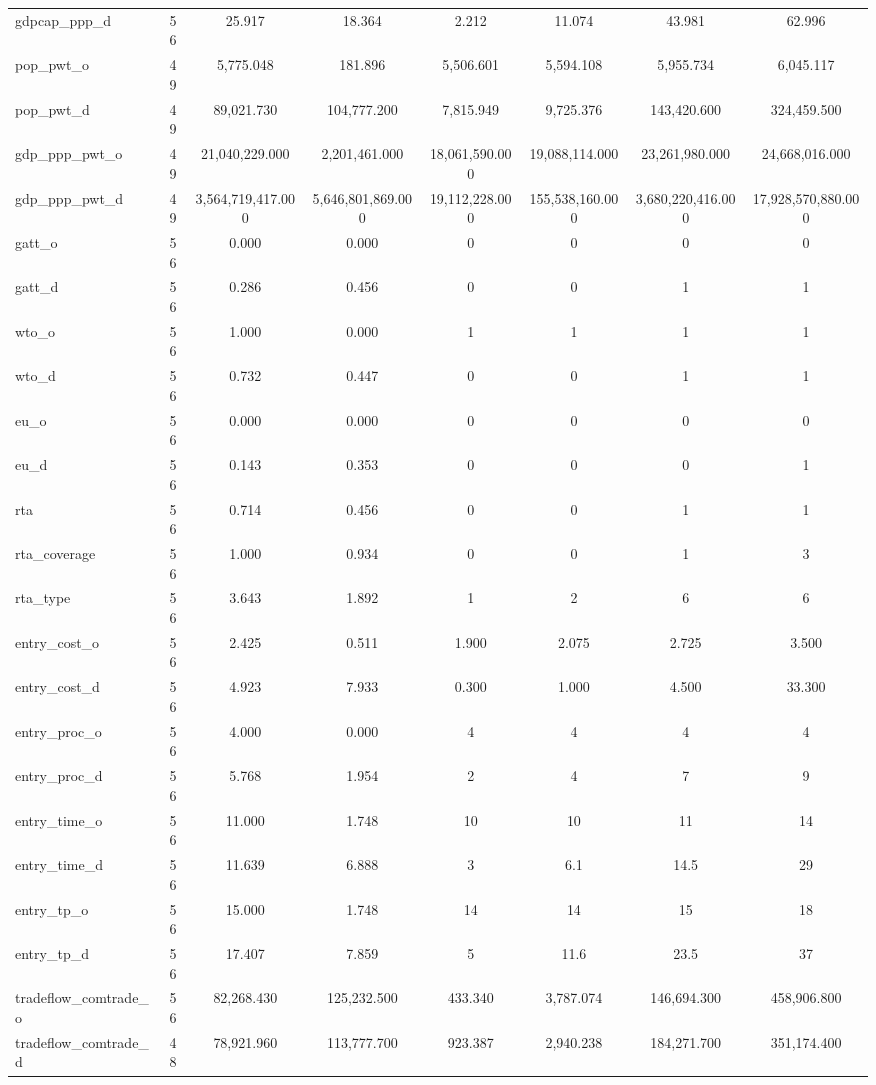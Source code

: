 \begin{table}[!htbp]
\begin{tabular}{@{\extracolsep{5pt}}lccccccc}
gdpcap\_ppp\_d & 56 & 25.917 & 18.364 & 2.212 & 11.074 & 43.981 & 62.996 \\ 
pop\_pwt\_o & 49 & 5,775.048 & 181.896 & 5,506.601 & 5,594.108 & 5,955.734 & 6,045.117 \\ 
pop\_pwt\_d & 49 & 89,021.730 & 104,777.200 & 7,815.949 & 9,725.376 & 143,420.600 & 324,459.500 \\ 
gdp\_ppp\_pwt\_o & 49 & 21,040,229.000 & 2,201,461.000 & 18,061,590.000 & 19,088,114.000 & 23,261,980.000 & 24,668,016.000 \\ 
gdp\_ppp\_pwt\_d & 49 & 3,564,719,417.000 & 5,646,801,869.000 & 19,112,228.000 & 155,538,160.000 & 3,680,220,416.000 & 17,928,570,880.000 \\ 
gatt\_o & 56 & 0.000 & 0.000 & 0 & 0 & 0 & 0 \\ 
gatt\_d & 56 & 0.286 & 0.456 & 0 & 0 & 1 & 1 \\ 
wto\_o & 56 & 1.000 & 0.000 & 1 & 1 & 1 & 1 \\ 
wto\_d & 56 & 0.732 & 0.447 & 0 & 0 & 1 & 1 \\ 
eu\_o & 56 & 0.000 & 0.000 & 0 & 0 & 0 & 0 \\ 
eu\_d & 56 & 0.143 & 0.353 & 0 & 0 & 0 & 1 \\ 
rta & 56 & 0.714 & 0.456 & 0 & 0 & 1 & 1 \\ 
rta\_coverage & 56 & 1.000 & 0.934 & 0 & 0 & 1 & 3 \\ 
rta\_type & 56 & 3.643 & 1.892 & 1 & 2 & 6 & 6 \\ 
entry\_cost\_o & 56 & 2.425 & 0.511 & 1.900 & 2.075 & 2.725 & 3.500 \\ 
entry\_cost\_d & 56 & 4.923 & 7.933 & 0.300 & 1.000 & 4.500 & 33.300 \\ 
entry\_proc\_o & 56 & 4.000 & 0.000 & 4 & 4 & 4 & 4 \\ 
entry\_proc\_d & 56 & 5.768 & 1.954 & 2 & 4 & 7 & 9 \\ 
entry\_time\_o & 56 & 11.000 & 1.748 & 10 & 10 & 11 & 14 \\ 
entry\_time\_d & 56 & 11.639 & 6.888 & 3 & 6.1 & 14.5 & 29 \\ 
entry\_tp\_o & 56 & 15.000 & 1.748 & 14 & 14 & 15 & 18 \\ 
entry\_tp\_d & 56 & 17.407 & 7.859 & 5 & 11.6 & 23.5 & 37 \\ 
tradeflow\_comtrade\_o & 56 & 82,268.430 & 125,232.500 & 433.340 & 3,787.074 & 146,694.300 & 458,906.800 \\ 
tradeflow\_comtrade\_d & 48 & 78,921.960 & 113,777.700 & 923.387 & 2,940.238 & 184,271.700 & 351,174.400 \\ 

\end{tabular}
\end{table}
